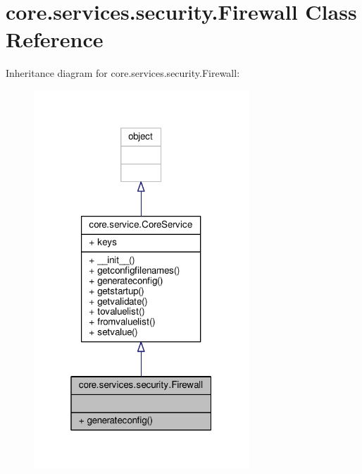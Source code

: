 \hypertarget{classcore_1_1services_1_1security_1_1_firewall}{\section{core.\+services.\+security.\+Firewall Class Reference}
\label{classcore_1_1services_1_1security_1_1_firewall}
}


Inheritance diagram for core.\+services.\+security.\+Firewall\+:
\nopagebreak
\begin{figure}[H]
\begin{center}
\leavevmode
\includegraphics[width=229pt]{classcore_1_1services_1_1security_1_1_firewall__inherit__graph}
\end{center}
\end{figure}


